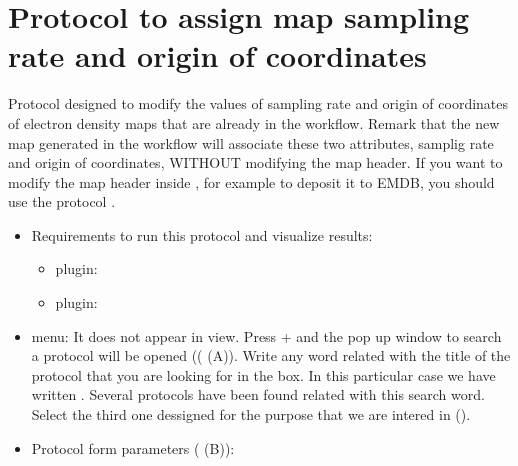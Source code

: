 \section{Protocol to assign map sampling rate and origin of coordinates}
\label{app:asignOrigAndSampling}%

Protocol designed to modify the values of sampling rate and origin of coordinates of electron density maps that are already in the \scipion workflow. Remark that the new map generated in the \scipion workflow will associate these two attributes, samplig rate and origin of coordinates, WITHOUT modifying the map header. If you want to modify the map header inside \scipion, for example to deposit it to EMDB, you should use the protocol .
   
 \begin{itemize}
  \item Requirements to run this protocol and visualize results:
    \begin{itemize}
        \item \scipion plugin: 
        \item \scipion plugin: 
    \end{itemize}
  \item \scipion menu:
  It does not appear in  view.
  Press  +  and the pop up window to search a protocol will be opened (( (A)). Write any word related with the title of the protocol that you are looking for in the  box. In this particular case we have written . Several protocols have been found related with this search word. Select the third one dessigned for the purpose that we are intered in ().
  
  \item Protocol form parameters ( (B)):
  

\end{itemize}
